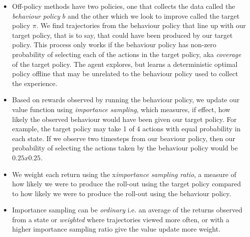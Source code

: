 \begin{itemize}
\item Off-policy methods have two policies, one that collects the data called the \textit{behaviour policy} $b$ and the other which we look to improve called the target policy $\pi$. We find trajectories from the behaviour policy that line up with our target policy, that is to say, that could have been produced by our target policy. This process only works if the behaviour policy has non-zero probability of selecting each of the actions in the target policy, aka \textit{coverage} of the target policy. The agent explores, but learns a deterministic optimal policy offline that may be unrelated to the behaviour policy used to collect the experience.
\item Based on rewards observed by running the behaviour policy, we update our value function using \textit{importance sampling}, which measures, if effect, how likely the observed behaviour would have been given our target policy. For example, the target policy may take 1 of 4 actions with equal probability in each state. If we observe two timesteps from our beaviour policy, then our probability of selecting the actions taken by the behaviour policy would be $0.25 x 0.25$. 
\item We weight each return using the x\textit{importance sampling ratio}, a measure of how likely we were to produce the roll-out using the target policy compared to how likely we were to produce the roll-out using the behaviour policy. 
\item Importance sampling can be \textit{ordinary} i.e. an average of the returns observed from a state or \textit{weighted} where trajectories viewed more often, or with a higher importance sampling ratio give the value update more weight.

\end{itemize}